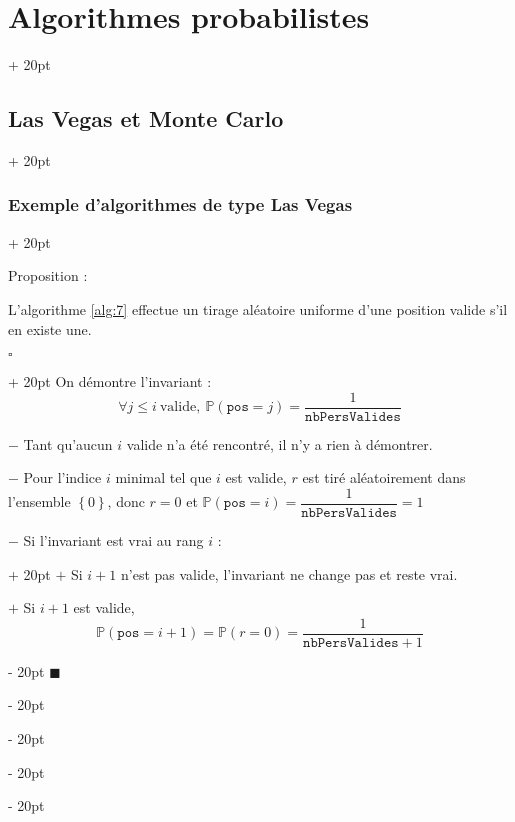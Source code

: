 \documentclass[a4paper, 12pt, twoside]{article}
\newenvironment{indalgo}[2][H]{
    \begin{algoBox}
        \begin{algorithm}[#1]
            \caption{#2}
}
{
        \end{algorithm}
    \end{algoBox}
}
\newcommand{\set}[1]{\left\{ #1 \right\}}
\renewcommand{\le}{\leqslant}
\newcommand{\ind}[1][20pt]{\advance\leftskip + #1}
\newcommand{\deind}[1][20pt]{\advance\leftskip - #1}
\newenvironment{indt}[2][20pt]{#2 \par \ind[#1]}{\par \deind} %
\newenvironment{proof}[1][{}]{\begin{indt}{$\square$ #1}}{$\blacksquare$ \end{indt}}
\newcommand{\1}{\mathbbm 1}
\begin{document}
\begin{indt}{\section{Algorithmes probabilistes}}
\begin{indt}{\subsection{Las Vegas et Monte Carlo}}
\begin{indt}{\subsubsection{Exemple d'algorithmes de type Las Vegas}}
\begin{indalgo}{Tirage aléatoire uniforme de la position}
{{                            
                        }
                    }

                \end{indalgo}

                \vspace{6pt}
                
                Proposition :
                \begin{emphBox}
                    L'algorithme \ref{alg:7} effectue un tirage aléatoire uniforme d'une position valide s'il en existe une.
                \end{emphBox}

                \vspace{6pt}
                
                \begin{proof}
                    On démontre l'invariant :
                    \[
                        \forall j \le i\ \text{valide},\
                        \mathbb P(\mathtt{pos} = j) = \dfrac{1}{\mathtt{nbPersValides}}
                    \]

                    $-$ Tant qu'aucun $i$ valide n'a été rencontré, il n'y a rien à démontrer.

                    $-$ Pour l'indice $i$ minimal tel que $i$ est valide, $r$ est tiré aléatoirement dans l'ensemble $\set 0$, donc $r = 0$ et $\mathbb P(\mathtt{pos} = i) = \dfrac{1}{\mathtt{nbPersValides}} = 1$

                    \begin{indt}{$-$ Si l'invariant est vrai au rang $i$ :}
                        $+$ Si $i + 1$ n'est pas valide, l'invariant ne change pas et reste vrai.

                        $+$ Si $i + 1$ est valide,
                        \[
                            \mathbb P(\mathtt{pos} = i + 1)
                            = \mathbb P(r = 0)
                            = \dfrac 1 {\mathtt{nbPersValides} + 1}
                        \]


\end{indt}
\end{proof}
\end{indt}
\end{indt}
\end{indt}
\end{document}
